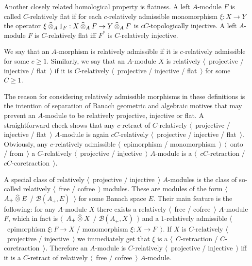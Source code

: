 Another closely related homological property is flatness. A
left $A$-module $F$ is called $C$-relatively flat if for each
$c$-relatively admissible monomorphism $\xi:X\to Y$ the operator 
$\xi\mathbin{\widehat{\otimes}}_{A} 1_F:X\mathbin{\widehat{\otimes}}_{A} F\to Y\mathbin{\widehat{\otimes}}_{A} F$ is
$cC$-topologically injective. A left $A$-module $F$ is $C$-relatively flat iff
$F^*$ is $C$-relatively injective. 

We say that an $A$-morphism is relatively admissible if it is $c$-relatively 
admissible for some $c\geq 1$. Similarly, we say that an $A$-module $X$ is 
relatively $\langle$~projective / injective / flat~$\rangle$ if it is  
$C$-relatively $\langle$~projective / injective / flat~$\rangle$ for 
some $C\geq 1$.

The reason for considering relatively admissible morphisms in these definitions
is the intention of separation of Banach geometric and algebraic motives that 
may prevent an $A$-module to be relatively projective, injective or flat. 
A straightforward check shows that any $c$-retract of 
$C$-relatively $\langle$~projective / injective / flat~$\rangle$ $A$-module is 
again $cC$-relatively $\langle$~projective / injective / flat~$\rangle$. 
Obviously, any $c$-relatively admissible $\langle$~epimorphism
/ monomorphism~$\rangle$ $\langle$~onto / from~$\rangle$ a $C$-relatively
$\langle$~projective / injective~$\rangle$ $A$-module is a 
$\langle$~$cC$-retraction / $cC$-coretraction~$\rangle$.

A special class of relatively $\langle$~projective / injective~$\rangle$
$A$-modules is the class of so-called 
relatively $\langle$~free / cofree~$\rangle$ modules. 
These are modules of the form $\langle$~$A_+\mathbin{\widehat{\otimes}} E$ /
$\mathcal{B}(A_+,E)$~$\rangle$ for some Banach space $E$. Their main feature is
the following: for any $A$-module $X$ there exists a relatively $\langle$~free /
cofree~$\rangle$ $A$-module $F$, which in fact is $\langle$~$A_+\mathbin{\widehat{\otimes}} X$ /
$\mathcal{B}(A_+,X)$~$\rangle$ and a $1$-relatively admissible 
$\langle$~epimorphism $\xi:F\to X$ / monomorphism $\xi:X\to F$~$\rangle$. 
If $X$ is $C$-relatively
$\langle$~projective / injective~$\rangle$ we immediately get that $\xi$ is a
$\langle$~$C$-retraction / $C$-coretraction~$\rangle$. Therefore an $A$-module 
is $C$-relatively $\langle$~projective / injective~$\rangle$ iff it is 
a $C$-retract of relatively $\langle$~free / cofree~$\rangle$ $A$-module. 

